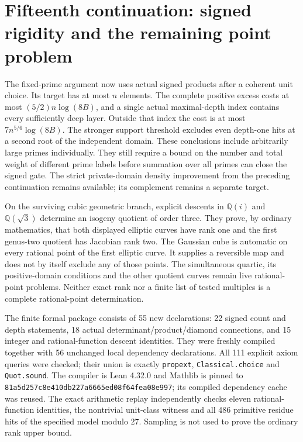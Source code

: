 \section{Fifteenth continuation: signed rigidity and the remaining point problem}
\label{fifteenth-status}

The fixed-prime argument now uses actual signed products after a coherent
unit choice. Its target has at most $n$ elements. The complete positive
excess costs at most $(5/2)n\log(8B)$, and a single actual maximal-depth
index contains every sufficiently deep layer. Outside that index the
cost is at most $7n^{5/6}\log(8B)$. The stronger support threshold
excludes even depth-one hits at a second root of the independent domain.
These conclusions include arbitrarily large primes individually. They
still require a bound on the number and total weight of different prime
labels before summation over all primes can close the signed gate.
The strict private-domain density improvement from the preceding
continuation remains available; its complement remains a separate target.

On the surviving cubic geometric branch, explicit descents in
$\mathbb Q(i)$ and $\mathbb Q(\sqrt3)$ determine an isogeny quotient
of order three. They prove, by ordinary mathematics, that both displayed
elliptic curves have rank one and the first genus-two quotient has
Jacobian rank two. The Gaussian cube is automatic on every rational
point of the first elliptic curve. It supplies a reversible map and
does not by itself exclude any of those points. The simultaneous
quartic, its positive-domain conditions and the other quotient curves
remain live rational-point problems. Neither exact rank nor a finite
list of tested multiples is a complete rational-point determination.

The finite formal package consists of 55 new declarations: 22 signed
count and depth statements, 18 actual determinant/product/diamond
connections, and 15 integer and rational-function descent identities.
They were freshly compiled together with 56 unchanged local dependency
declarations. All 111 explicit axiom queries were checked; their union
is exactly \texttt{propext}, \texttt{Classical.choice} and
\texttt{Quot.sound}. The compiler is Lean 4.32.0 and Mathlib is pinned
to \texttt{81a5d257c8e410db227a6665ed08f64fea08e997}; its compiled
dependency cache was reused. The exact arithmetic replay independently
checks eleven rational-function identities, the nontrivial unit-class
witness and all 486 primitive residue hits of the specified model
modulo 27. Sampling is not used to prove the ordinary rank upper bound.

